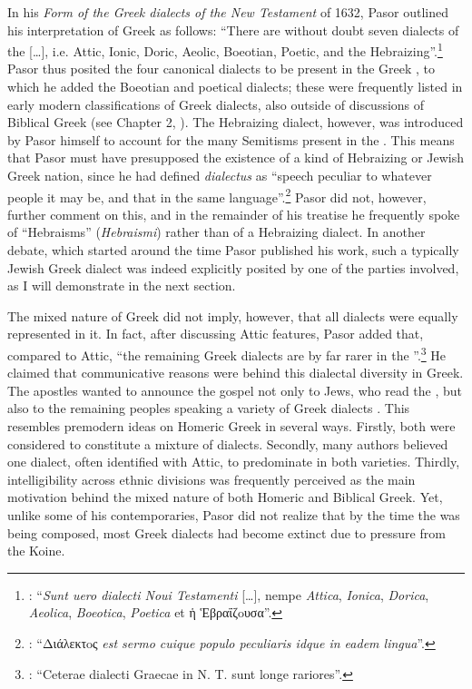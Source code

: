 In his \textit{Form of the Greek dialects of the New Testament} of 1632, Pasor outlined his interpretation of  Greek as follows: “There are without doubt seven dialects of the  […], i.e. Attic, Ionic, Doric, Aeolic, Boeotian, Poetic, and the Hebraizing”.\footnote{\citet[1--2]{Pasor1632}: “\textit{Sunt uero dialecti Noui Testamenti} […], nempe \textit{Attica}, \textit{Ionica}, \textit{Dorica}, \textit{Aeolica}, \textit{Boeotica}, \textit{Poetica} et ἡ Ἑβραΐζoυσα”.} Pasor thus posited the four canonical dialects to be present in the Greek , to which he added the Boeotian and poetical dialects; these were frequently listed in early modern classifications of Greek dialects, also outside of discussions of Biblical Greek (see Chapter 2, ). The Hebraizing dialect, however, was introduced by Pasor himself to account for the many Semitisms present in the . This means that Pasor must have presupposed the existence of a kind of Hebraizing or Jewish Greek nation, since he had defined \textit{dialectus} as “speech peculiar to whatever people it may be, and that in the same language”.\footnote{\citet[1]{Pasor1632}: “Διάλεκτoς \textit{est sermo cuique populo peculiaris idque in eadem lingua}”.} Pasor did not, however, further comment on this, and in the remainder of his treatise he frequently spoke of “Hebraisms” (\textit{Hebraismi}) rather than of a Hebraizing dialect. In another debate, which started around the time Pasor published his work, such a typically Jewish Greek dialect was indeed explicitly posited by one of the parties involved, as I will demonstrate in the next section.

The mixed nature of  Greek did not imply, however, that all dialects were equally represented in it. In fact, after discussing Attic features, Pasor added that, compared to Attic, “the remaining Greek dialects are by far rarer in the ”.\footnote{\citet[24]{Pasor1632}: “Ceterae dialecti Graecae in N. T. sunt longe rariores”.} He claimed that communicative reasons were behind this dialectal diversity in  Greek. The apostles wanted to announce the gospel not only to Jews, who read the , but also to the remaining peoples speaking a variety of Greek dialects \citep[143]{Pasor1650}. This resembles premodern ideas on Homeric Greek in several ways. Firstly, both were considered to constitute a mixture of dialects. Secondly, many authors believed one dialect, often identified with Attic, to predominate in both varieties. Thirdly, intelligibility across ethnic divisions was frequently perceived as the main motivation behind the mixed nature of both Homeric and Biblical Greek. Yet, unlike some of his contemporaries, Pasor did not realize that by the time the  was being composed, most Greek dialects had become extinct due to pressure from the Koine.

